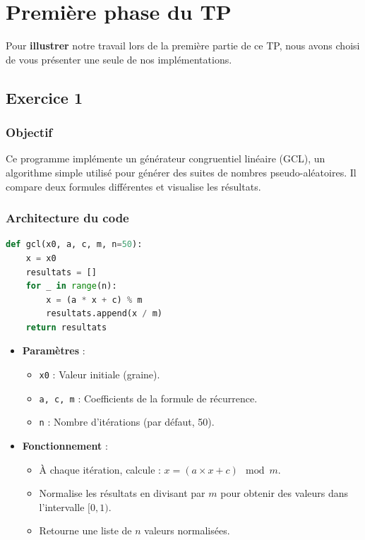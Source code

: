 \documentclass{article}
\begin{document}
\section{Première phase du TP}
Pour \textbf{illustrer} notre travail lors de la première partie de ce TP, nous avons choisi de vous présenter une seule de nos implémentations.

\subsection{Exercice 1}
\subsubsection{Objectif}
Ce programme implémente un générateur congruentiel linéaire (GCL), un algorithme simple utilisé pour générer des suites de nombres pseudo-aléatoires. Il compare deux formules différentes et visualise les résultats.

\subsubsection{Architecture du code}
\begin{lstlisting}[language=Python, caption=Implémentation de la fonction générateur congruentiel linéaire (gcl)]
def gcl(x0, a, c, m, n=50):
    x = x0
    resultats = []
    for _ in range(n):
        x = (a * x + c) % m
        resultats.append(x / m)
    return resultats
\end{lstlisting}
\begin{itemize}[leftmargin=*, noitemsep]
    \item \textbf{Paramètres} :
    \begin{itemize}[leftmargin=*, noitemsep]
        \item \texttt{x0} : Valeur initiale (graine).
        \item \texttt{a, c, m} : Coefficients de la formule de récurrence.
        \item \texttt{n} : Nombre d’itérations (par défaut, 50).
    \end{itemize}
    \item \textbf{Fonctionnement} :
    \begin{itemize}[leftmargin=*, noitemsep]
        \item À chaque itération, calcule : \( x = (a \times x + c) \mod m \).
        \item Normalise les résultats en divisant par \( m \) pour obtenir des valeurs dans l’intervalle \([0, 1)\).
        \item Retourne une liste de \( n \) valeurs normalisées.
    \end{itemize}
\end{itemize}
\end{document}

